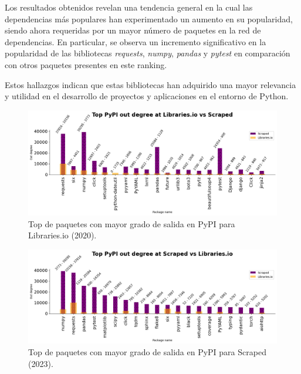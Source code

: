 Los resultados obtenidos revelan una tendencia general en la cual las dependencias más populares han
experimentado un aumento en su popularidad, siendo ahora requeridas por un mayor número de paquetes
en la red de dependencias. En particular, se observa un incremento significativo en la popularidad
de las bibliotecas \textit{requests}, \textit{numpy}, \textit{pandas} y \textit{pytest} en comparación
con otros paquetes presentes en este ranking.

Estos hallazgos indican que estas bibliotecas han adquirido una mayor relevancia y utilidad en el
desarrollo de proyectos y aplicaciones en el entorno de Python.

\begin{figure}[ht!]
    \begin{center}
        \includegraphics[width=1\textwidth]{img/pypi/libio_t20_outd_comparison.png}
        \caption{Top de paquetes con mayor grado de salida en PyPI para Libraries.io (2020).}
        \label{fig:pypi_libio_outd_comparison}
    \end{center}
\end{figure}

\begin{figure}[ht!]
    \begin{center}
        \includegraphics[width=1\textwidth]{img/pypi/libio_scraped_t20_comparation.png}
        \caption{Top de paquetes con mayor grado de salida en PyPI para Scraped (2023).}
        \label{fig:pypi_scraped_outd_comparison}
    \end{center}
\end{figure}

